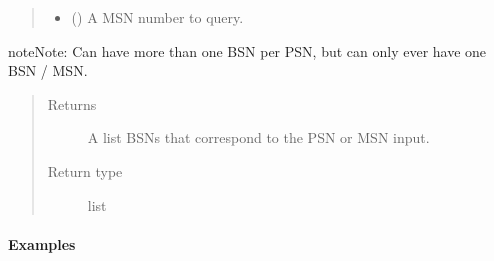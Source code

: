 \documentclass[letterpaper,10pt,english]{sphinxmanual}
\begin{document}
\begin{fulllineitems}
\begin{fulllineitems}
\begin{quote}
\begin{description}
\begin{itemize}
\item {} 
 () \textendash{} A MSN number to query.

\end{itemize}

\end{description}\end{quote}

\begin{sphinxadmonition}{note}{Note:}
Can have more than one BSN per PSN, but can only ever have
one BSN / MSN.
\end{sphinxadmonition}
\begin{quote}\begin{description}
\item[{Returns}] \leavevmode
A list BSNs that correspond to the PSN or MSN input.

\item[{Return type}] \leavevmode
list

\end{description}\end{quote}
\paragraph{Examples}

%
\begin{sphinxVerbatim}[commandchars=\\\{\}]
\end{sphinxVerbatim}

%
\begin{sphinxVerbatim}[commandchars=\\\{\}]
\end{sphinxVerbatim}

%
\begin{sphinxVerbatim}[commandchars=\\\{\}]
\end{sphinxVerbatim}


\end{fulllineitems}
\end{fulllineitems}
\end{document}
